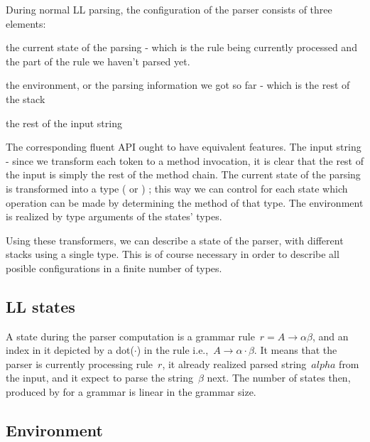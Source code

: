 During normal LL parsing, the configuration of the parser consists
  of three elements:
\begin{Itemize}
  \item the current state of the parsing - which is the
    rule being currently processed and the part of the rule we
    haven't parsed yet.
  \item the environment, or the parsing information we got so far -
    which is the rest of the stack
  \item the rest of the input string
\end{Itemize}

The corresponding \Java fluent API ought to have equivalent features.
The input string - since we transform each
  token to a method invocation, it is clear that the rest of the input is
  simply the rest of the method chain.
The current state of the parsing is transformed into a \Java type
  ( or ) ; this way we can control for each state
  which operation can be made by determining the method of that type.
The environment is realized by type arguments of the states' \Java types.

Using these transformers, we can describe a state of the parser,
  with different stacks using a single type.
This is of course necessary in order to describe all posible configurations
  in a finite number of \Java types.

\subsection{LL states}
A state during the parser computation is a grammar rule~$r = A→αβ$, and an
index in it depicted by a dot($·$) in the rule i.e.,~$A→α·β$.
It means that the parser is currently processing rule~$r$, it already realized parsed string~$alpha$
  from the input, and it expect to parse the string~$β$ next.
The number of states then, produced by \Fajita for a grammar is linear in the grammar size.
\subsection{Environment}


\renewcommand{\LET}[2]{\STATE{\textbf{Let} \ensuremath{\text{#1}←\text{#2}}}}
\newcommand\INPUT\REQUIRE
\newcommand\OUTPUT\ENSURE
\def\function#1(#2){\ensuremath{\textrm{\textup{\textsf{#1}}}(#2)}}
\def\table#1[#2]{\ensuremath{\textsf{#1}[#2]}}

